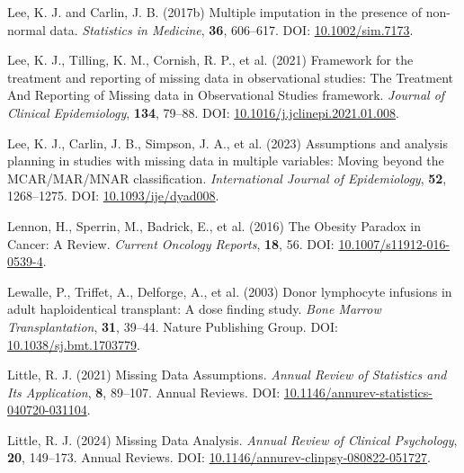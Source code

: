 \documentclass[
  letterpaper,
  paper=240mm:170mm,
  twoside=true,
  open=right,
  fontsize=10pt,
  pagesize=false,
  BCOR=15mm,
  DIV=14,
  headinclude=true,
  footinclude=false,
  headsepline=on]{scrbook}
\newlength{\cslhangindent}
\newenvironment{CSLReferences}[2] %
 {\begin{list}{}{%
  \setlength{\itemindent}{0pt}
  \setlength{\leftmargin}{0pt}
  \setlength{\parsep}{0pt}
  \ifodd #1
   \setlength{\leftmargin}{\cslhangindent}
   \setlength{\itemindent}{-1\cslhangindent}
  \fi
  \setlength{\itemsep}{#2\baselineskip}}}
 {\end{list}}
\begin{document}
\begin{CSLReferences}{1}{1}
Lee, K. J. and Carlin, J. B. (2017b) Multiple imputation in the presence
of non-normal data. \emph{Statistics in Medicine}, \textbf{36},
606--617. DOI:
\href{https://doi.org/10.1002/sim.7173}{10.1002/sim.7173}.

Lee, K. J., Tilling, K. M., Cornish, R. P., et al. (2021) Framework for
the treatment and reporting of missing data in observational studies:
{The Treatment And Reporting} of {Missing} data in {Observational
Studies} framework. \emph{Journal of Clinical Epidemiology},
\textbf{134}, 79--88. DOI:
\href{https://doi.org/10.1016/j.jclinepi.2021.01.008}{10.1016/j.jclinepi.2021.01.008}.

Lee, K. J., Carlin, J. B., Simpson, J. A., et al. (2023) Assumptions and
analysis planning in studies with missing data in multiple variables:
Moving beyond the {MCAR}/{MAR}/{MNAR} classification.
\emph{International Journal of Epidemiology}, \textbf{52}, 1268--1275.
DOI: \href{https://doi.org/10.1093/ije/dyad008}{10.1093/ije/dyad008}.

Lennon, H., Sperrin, M., Badrick, E., et al. (2016) The {Obesity
Paradox} in {Cancer}: A {Review}. \emph{Current Oncology Reports},
\textbf{18}, 56. DOI:
\href{https://doi.org/10.1007/s11912-016-0539-4}{10.1007/s11912-016-0539-4}.

Lewalle, P., Triffet, A., Delforge, A., et al. (2003) Donor lymphocyte
infusions in adult haploidentical transplant: A dose finding study.
\emph{Bone Marrow Transplantation}, \textbf{31}, 39--44. Nature
Publishing Group. DOI:
\href{https://doi.org/10.1038/sj.bmt.1703779}{10.1038/sj.bmt.1703779}.

Little, R. J. (2021) Missing {Data Assumptions}. \emph{Annual Review of
Statistics and Its Application}, \textbf{8}, 89--107. Annual Reviews.
DOI:
\href{https://doi.org/10.1146/annurev-statistics-040720-031104}{10.1146/annurev-statistics-040720-031104}.

Little, R. J. (2024) Missing {Data Analysis}. \emph{Annual Review of
Clinical Psychology}, \textbf{20}, 149--173. Annual Reviews. DOI:
\href{https://doi.org/10.1146/annurev-clinpsy-080822-051727}{10.1146/annurev-clinpsy-080822-051727}.


\end{CSLReferences}
\end{document}

